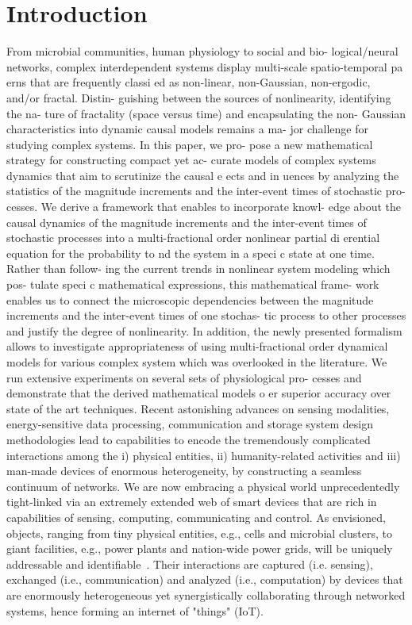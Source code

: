 \chapter{Introduction}
\label{cha:introduction}
From microbial communities, human physiology to social and bio- logical/neural networks, complex interdependent systems display multi-scale spatio-temporal pa erns that are frequently classi ed as non-linear, non-Gaussian, non-ergodic, and/or fractal. Distin- guishing between the sources of nonlinearity, identifying the na- ture of fractality (space versus time) and encapsulating the non- Gaussian characteristics into dynamic causal models remains a ma- jor challenge for studying complex systems. In this paper, we pro- pose a new mathematical strategy for constructing compact yet ac- curate models of complex systems dynamics that aim to scrutinize the causal e ects and in uences by analyzing the statistics of the magnitude increments and the inter-event times of stochastic pro- cesses. We derive a framework that enables to incorporate knowl- edge about the causal dynamics of the magnitude increments and the inter-event times of stochastic processes into a multi-fractional order nonlinear partial di erential equation for the probability to  nd the system in a speci c state at one time. Rather than follow- ing the current trends in nonlinear system modeling which pos- tulate speci c mathematical expressions, this mathematical frame- work enables us to connect the microscopic dependencies between the magnitude increments and the inter-event times of one stochas- tic process to other processes and justify the degree of nonlinearity. In addition, the newly presented formalism allows to investigate appropriateness of using multi-fractional order dynamical models for various complex system which was overlooked in the literature. We run extensive experiments on several sets of physiological pro- cesses and demonstrate that the derived mathematical models o er superior accuracy over state of the art techniques.
Recent astonishing advances on sensing modalities, energy-sensitive data processing, communication and storage system design methodologies lead to capabilities to encode the tremendously complicated interactions among the i) physical entities, ii) humanity-related activities and iii) man-made devices of enormous heterogeneity, by constructing a seamless continuum of networks.  We are now embracing  a physical world unprecedentedly tight-linked via an extremely extended web of smart devices that are rich in capabilities of sensing, computing, communicating and control. As envisioned, objects, ranging from tiny physical entities, e.g., cells and microbial clusters, to giant facilities, e.g., power plants and nation-wide power grids, will be uniquely addressable and identifiable~\cite{zanella2014internet}. Their interactions are captured (i.e. sensing), exchanged (i.e., communication) and analyzed (i.e., computation) by devices that are enormously heterogeneous yet synergistically collaborating through networked systems, hence forming an internet of "things" (IoT).

